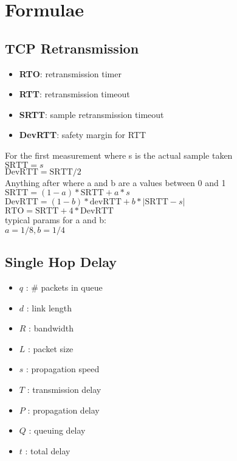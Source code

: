 \section{Formulae}
\subsection{TCP Retransmission}
\begin{itemize}[itemsep=0em]
  \item \textbf{RTO}: retransmission timer
  \item \textbf{RTT}: retransmission timeout
  \item \textbf{SRTT}: sample retransmission timeout
  \item \textbf{DevRTT}: safety margin for RTT  
\end{itemize}
\footnotesize
For the first measurement where s is the actual sample taken \\
$\mathrm{SRTT} = s$ \\
$\mathrm{DevRTT} = \mathrm{SRTT} / 2$ \\
Anything after where a and b are a values between 0 and 1 \\
$\mathrm{SRTT} = (1 - a) * \mathrm{SRTT} + a * s$ \\
$\mathrm{DevRTT} = (1 - b) * \mathrm{devRTT} + b * |\mathrm{SRTT} - s|$ \\
$\mathrm{RTO} = \mathrm{SRTT} + 4 * \mathrm{DevRTT}$ \\
typical params for a and b: \\
$a = 1 / 8, b = 1 / 4$ \\
\small
\subsection{Single Hop Delay}
\begin{itemize}[itemsep=0em]
  \item $q$ : \# packets in queue
  \item $d$ : link length
  \item $R$ : bandwidth
  \item $L$ : packet size
  \item $s$ : propagation speed
  \item $T$ : transmission delay
  \item $P$ : propagation delay
  \item $Q$ : queuing delay
  \item $t$ : total delay
\end{itemize}
